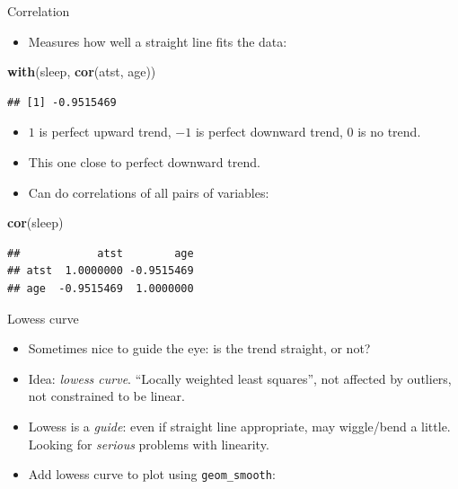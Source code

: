 \documentclass[ignorenonframetext,]{beamer}
\newenvironment{Shaded}{\begin{snugshade}}{\end{snugshade}}
\newcommand{\KeywordTok}[1]{\textcolor[rgb]{0.13,0.29,0.53}{\textbf{#1}}}
\newcommand{\NormalTok}[1]{#1}
\providecommand{\tightlist}{%
  \setlength{\itemsep}{0pt}\setlength{\parskip}{0pt}}
\begin{document}
\begin{frame}[fragile]{Correlation}
\protect\hypertarget{correlation}{}

\begin{itemize}
\tightlist
\item
  Measures how well a straight line fits the data:
\end{itemize}

\begin{Shaded}
\begin{Highlighting}[]
\KeywordTok{with}\NormalTok{(sleep, }\KeywordTok{cor}\NormalTok{(atst, age))}
\end{Highlighting}
\end{Shaded}

\begin{verbatim}
## [1] -0.9515469
\end{verbatim}

\begin{itemize}
\item
  \(1\) is perfect upward trend, \(-1\) is perfect downward trend, 0 is
  no trend.
\item
  This one close to perfect downward trend.
\item
  Can do correlations of all pairs of variables:
\end{itemize}

\begin{Shaded}
\begin{Highlighting}[]
\KeywordTok{cor}\NormalTok{(sleep)}
\end{Highlighting}
\end{Shaded}

\begin{verbatim}
##            atst        age
## atst  1.0000000 -0.9515469
## age  -0.9515469  1.0000000
\end{verbatim}

\end{frame}

\begin{frame}[fragile]{Lowess curve}
\protect\hypertarget{lowess-curve}{}

\begin{itemize}
\item
  Sometimes nice to guide the eye: is the trend straight, or not?
\item
  Idea: \emph{lowess curve}. ``Locally weighted least squares'', not
  affected by outliers, not constrained to be linear.
\item
  Lowess is a \emph{guide}: even if straight line appropriate, may
  wiggle/bend a little. Looking for \emph{serious} problems with
  linearity.
\item
  Add lowess curve to plot using \texttt{geom\_smooth}:
\end{itemize}

\end{frame}
\end{document}
